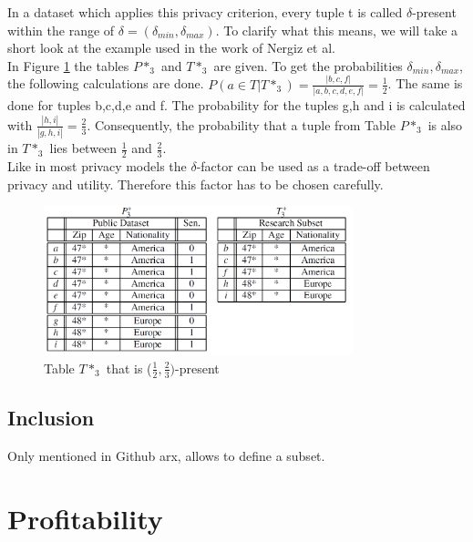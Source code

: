 \documentclass[12pt, a4paper,oneside]{report}
\begin{document}
In a dataset which applies this privacy criterion, every tuple t is called $\delta$-present within the range of $\delta = (\delta_{min}, \delta_{max})$. To clarify what this means, we will take a short look at the example used in the work of Nergiz et al.\\
In Figure \ref{fig:6} the tables $P*_3$ and $T*_3$ are given. To get the probabilities $\delta_{min}, \delta_{max}$, the following calculations are done. $P(a \in T | T*_3) = \frac{|{b,c,f}|}{|{a,b,c,d,e,f}|} = \frac{1}{2}$. The same is done for tuples b,c,d,e and f. The probability for the tuples g,h and i is calculated with $\frac{|{h,i}|}{|{g,h,i}|} = \frac{2}{3}$. Consequently, the probability that a tuple from Table $P*_3$ is also in $T*_3$ lies between $\frac{1}{2}$ and $\frac{2}{3}$.\\  
Like in most privacy models the $\delta$-factor can be used as a trade-off between privacy and utility. Therefore this factor has to be chosen carefully. 
\begin{figure}[h]
	\centering
	\includegraphics[width=0.8\textwidth]{d-presence-example}
	\caption{Table $T*_3$ that is ($\frac{1}{2}, \frac{2}{3})$-present  \cite{Nergiz2007}}
	\label{fig:6}
\end{figure}


\subsection{Inclusion}

Only mentioned in Github arx, allows to define a subset. 

\section{Profitability}
\end{document}
